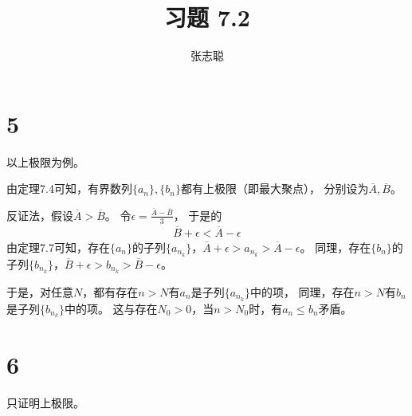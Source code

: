 \documentclass{article}
\begin{document}
\title{习题 7.2}
\author{张志聪}
\maketitle

\section*{5}

以上极限为例。

由定理7.4可知，有界数列$\{a_n\}, \{b_n\}$都有上极限（即最大聚点），
分别设为$\overline{A}, \overline{B}$。

反证法，假设$\overline{A} > \overline{B}$。
令$\epsilon = \frac{\overline{A} - \overline{B}}{3}$，
于是的
\begin{align*}
  \overline{B} + \epsilon < \overline{A} - \epsilon
\end{align*}
由定理7.7可知，存在$\{a_n\}$的子列$\{a_{n_k}\}$，$\overline{A} + \epsilon > a_{n_k} > \overline{A} - \epsilon$。
同理，存在$\{b_n\}$的子列$\{b_{n_k}\}$，$\overline{B} + \epsilon > b_{n_k} > \overline{B} - \epsilon$。

于是，对任意$N$，都有存在$n > N$有$a_n$是子列$\{a_{n_k}\}$中的项，
同理，存在$n > N$有$b_n$是子列$\{b_{n_k}\}$中的项。
这与存在$N_0 > 0$，当$n > N_0$时，有$a_n \leq b_n$矛盾。

\section*{6}

只证明上极限。
\end{document}
